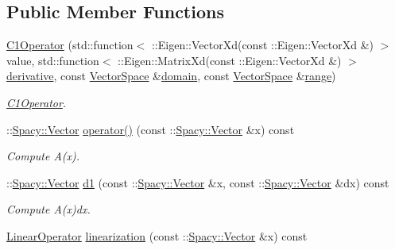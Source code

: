 \subsection*{Public Member Functions}
\begin{DoxyCompactItemize}
\item 
\hyperlink{classSpacy_1_1Rn_1_1C1Operator_ace713dafa8c7422f57f0f1c0a989db12}{C1\+Operator} (std\+::function$<$ \+::Eigen\+::\+Vector\+Xd(const \+::Eigen\+::\+Vector\+Xd \&) $>$ value, std\+::function$<$ \+::Eigen\+::\+Matrix\+Xd(const \+::Eigen\+::\+Vector\+Xd \&) $>$ \hyperlink{namespaceSpacy_a002fe344fa6d04a6ac59a74ea25fddb6}{derivative}, const \hyperlink{classSpacy_1_1VectorSpace}{Vector\+Space} \&\hyperlink{classSpacy_1_1OperatorBase_a2588f9b3e0188820c4c494e63293dc6f}{domain}, const \hyperlink{classSpacy_1_1VectorSpace}{Vector\+Space} \&\hyperlink{classSpacy_1_1OperatorBase_ab19d3b7a6f290b1079248f1e567e53d6}{range})
\begin{DoxyCompactList}\small\item\em \hyperlink{classSpacy_1_1Rn_1_1C1Operator}{C1\+Operator}. \end{DoxyCompactList}\item 
\+::\hyperlink{classSpacy_1_1Vector}{Spacy\+::\+Vector} \hyperlink{classSpacy_1_1Rn_1_1C1Operator_a21205efc25688cb7d5f184eeb637df60}{operator()} (const \+::\hyperlink{classSpacy_1_1Vector}{Spacy\+::\+Vector} \&x) const \hypertarget{classSpacy_1_1Rn_1_1C1Operator_a21205efc25688cb7d5f184eeb637df60}{}\label{classSpacy_1_1Rn_1_1C1Operator_a21205efc25688cb7d5f184eeb637df60}

\begin{DoxyCompactList}\small\item\em Compute A(x). \end{DoxyCompactList}\item 
\+::\hyperlink{classSpacy_1_1Vector}{Spacy\+::\+Vector} \hyperlink{classSpacy_1_1Rn_1_1C1Operator_af15f1491a967262ffcfe6d484d440940}{d1} (const \+::\hyperlink{classSpacy_1_1Vector}{Spacy\+::\+Vector} \&x, const \+::\hyperlink{classSpacy_1_1Vector}{Spacy\+::\+Vector} \&dx) const \hypertarget{classSpacy_1_1Rn_1_1C1Operator_af15f1491a967262ffcfe6d484d440940}{}\label{classSpacy_1_1Rn_1_1C1Operator_af15f1491a967262ffcfe6d484d440940}

\begin{DoxyCompactList}\small\item\em Compute A\textquotesingle{}(x)dx. \end{DoxyCompactList}\item 
\hyperlink{classSpacy_1_1Rn_1_1LinearOperator}{Linear\+Operator} \hyperlink{classSpacy_1_1Rn_1_1C1Operator_a507155c1dbf6f312cf4864b509ed84bc}{linearization} (const \+::\hyperlink{classSpacy_1_1Vector}{Spacy\+::\+Vector} \&x) const \hypertarget{classSpacy_1_1Rn_1_1C1Operator_a507155c1dbf6f312cf4864b509ed84bc}{}\label{classSpacy_1_1Rn_1_1C1Operator_a507155c1dbf6f312cf4864b509ed84bc}


\end{DoxyCompactItemize}
